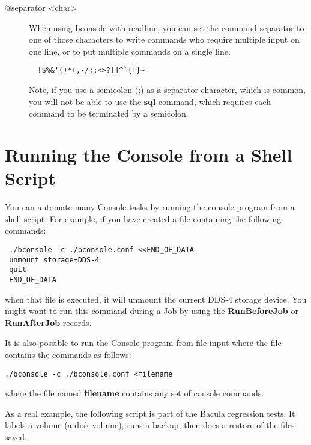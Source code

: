 \begin{description}
\item [@separator {\textless}char{\textgreater}]
  When using bconsole with readline, you can set the command separator to one
  of those characters to write commands who require multiple input on one line,
  or to put multiple commands on a single line.
\begin{verbatim}
  !$%&'()*+,-/:;<>?[]^`{|}~
\end{verbatim}

  Note, if you use a semicolon (;) as a separator character, which is
  common, you will not be able to use the {\bf sql} command, which
  requires each command to be terminated by a semicolon.

\end{description}

\label{scripting}
\section{Running the Console from a Shell Script}

You can automate many Console tasks by running the console program from a
shell script. For example, if you have created a file containing the following
commands:

\footnotesize
\begin{verbatim}
 ./bconsole -c ./bconsole.conf <<END_OF_DATA
 unmount storage=DDS-4
 quit
 END_OF_DATA
\end{verbatim}
\normalsize

when that file is executed, it will unmount the current DDS-4 storage device.
You might want to run this command during a Job by using the {\bf
RunBeforeJob} or {\bf RunAfterJob} records.

It is also possible to run the Console program from file input where the file
contains the commands as follows:

\footnotesize
\begin{verbatim}
./bconsole -c ./bconsole.conf <filename
\end{verbatim}
\normalsize

where the file named {\bf filename} contains any set of console commands.

As a real example, the following script is part of the Bacula regression
tests. It labels a volume (a disk volume), runs a backup, then does a restore
of the files saved.

